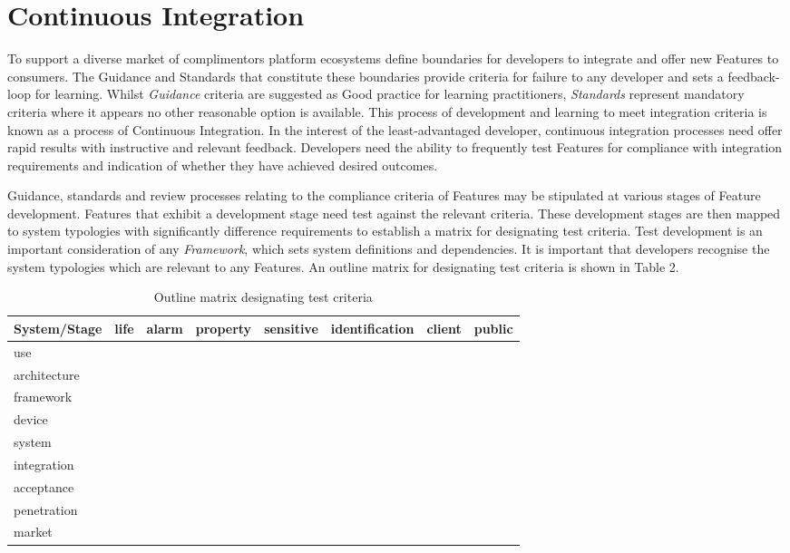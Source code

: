 \documentclass[11pt, oneside]{article}   	%
\begin{document}
\section{Continuous Integration}
To support a diverse market of complimentors platform ecosystems define boundaries for developers to integrate and offer new Features to consumers.
The Guidance and Standards that constitute these boundaries provide criteria for failure to any developer and sets a feedback-loop for learning.
Whilst \emph{Guidance} criteria are suggested as Good practice for learning practitioners, \emph{Standards} represent mandatory criteria where it appears no other reasonable option is available.
This process of development and learning to meet integration criteria is known as a process of Continuous Integration.
In the interest of the least-advantaged developer, continuous integration processes need offer rapid results with instructive and relevant feedback.
Developers need the ability to frequently test Features for compliance with integration requirements and indication of whether they have achieved desired outcomes.\

Guidance, standards and review processes relating to the compliance criteria of Features may be stipulated at various stages of Feature development.
Features that exhibit a development stage need test against the relevant criteria.
These development stages are then mapped to system typologies with significantly difference requirements to establish a matrix for designating test criteria.
Test development is an important consideration of any \emph{Framework}, which sets system definitions and dependencies.
It is important that developers recognise the system typologies which are relevant to any Features.
An outline matrix for designating test criteria is shown in Table 2.

\begin{table}[h]
\caption{Outline matrix designating test criteria}
\begin{center}
\begin{tabular}{| l | c | c | c | c | c | c | c |}
\hline
System/Stage&life&alarm&property&sensitive&identification&client&public\\
\hline
use&&&&&&&\\
architecture&&&&&&&\\
framework&&&&&&&\\
device&&&&&&&\\
system&&&&&&&\\
integration&&&&&&&\\
acceptance&&&&&&&\\
penetration&&&&&&&\\
market&&&&&&&\\
\hline
\end{tabular}
\end{center}
\label{Social contributions table}
\end{table}
\end{document}
